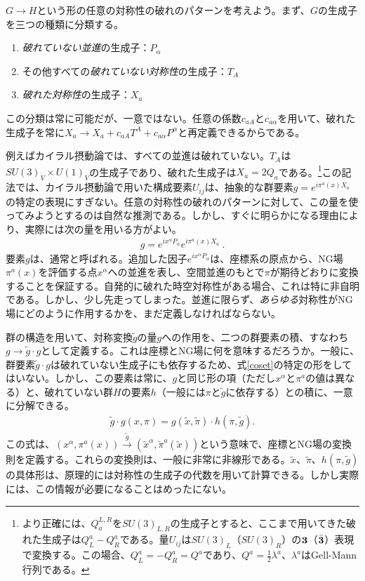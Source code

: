 $G \to H$という形の任意の対称性の破れのパターンを考えよう。まず、$G$の生成子を三つの種類に分類する。
%
\begin{enumerate}
	\item \emph{破れていない並進}の生成子：$P_\alpha$
	\item その他すべての\emph{破れていない対称性}の生成子：$T_A$
	\item \emph{破れた対称性}の生成子：$X_a$
\end{enumerate}
%
この分類は常に可能だが、一意ではない。任意の係数$c_{a A}$と$c_{a \alpha}$を用いて、破れた生成子を常に$X_a \to X_a + c_{a A}T^A+ c_{a \alpha}P^\alpha$と再定義できるからである。

例えばカイラル摂動論では、すべての並進は破れていない。$T_A$は$SU(3)_V \times U(1)_V$の生成子であり、破れた生成子は$X_a = 2 Q_a$である。\footnote{より正確には、$Q^{L,R}_a$を$SU(3)_{L,R}$の生成子とすると、ここまで用いてきた破れた生成子は$Q_L^a-Q_R^a$である。量$U_{ij}$は$SU(3)_L$（$SU(3)_R$）の${\mathbf 3}$（$\bar {\mathbf  3}$）表現で変換する。この場合、$Q_L^a= - Q_R^a = Q^a$であり、$Q^a= \tfrac{1}{2} \lambda^a$、$\lambda^a$はGell-Mann行列である。}この記法では、カイラル摂動論で用いた構成要素$U_{ij}$は、抽象的な群要素$g = e^{i \pi^a(x) X_a}$の特定の表現にすぎない。任意の対称性の破れのパターンに対して、この量を使ってみようとするのは自然な推測である。しかし、すぐに明らかになる理由により、実際には次の量を用いる方がよい。
%
\begin{align} \label{coset}
	g  = e^{i x^\alpha P_\alpha} e^{i \pi^a(x) X_a} \ . 
\end{align}
%
要素$g$は、通常と呼ばれる。追加した因子$e^{i x^\alpha P_\alpha}$は、座標系の原点から、NG場$\pi^a(x)$を評価する点$x^\alpha$への並進を表し、空間並進のもとで$\pi$が期待どおりに変換することを保証する。自発的に破れた時空対称性がある場合、これは特に非自明である。しかし、少し先走ってしまった。並進に限らず、\emph{あらゆる}対称性がNG場にどのように作用するかを、まだ定義しなければならない。

群の構造を用いて、対称変換$\tilde g$の量$g$への作用を、二つの群要素の積、すなわち$g \to \tilde g \cdot g$として定義する。これは座標とNG場に何を意味するだろうか。一般に、群要素$\tilde g \cdot g$は破れていない生成子にも依存するため、式\eqref{coset}の特定の形をしてはいない。しかし、この要素は常に、$g$と同じ形の項（ただし$x^\alpha$と$\pi^a$の値は異なる）と、破れていない群$H$の要素$h$（一般には$\pi$と$\tilde g$に依存する）との積に、一意に分解できる。
%
\begin{align} \label{coset transformation rule}
	\tilde g  \cdot g (x, \pi) = g (\tilde x, \tilde \pi) \cdot h(\pi, \tilde g) .
\end{align}
% 
この式は、$(x^\alpha, \pi^a(x) ) \stackrel{\tilde g}{\longrightarrow}  (\tilde x^\alpha, \tilde \pi^a(\tilde x) )$という意味で、座標とNG場の変換則を定義する。これらの変換則は、一般に非常に非線形である。$\tilde x$、$\tilde \pi$、$h(\pi, \tilde g)$の具体形は、原理的には対称性の生成子の代数を用いて計算できる。しかし実際には、この情報が必要になることはめったにない。

